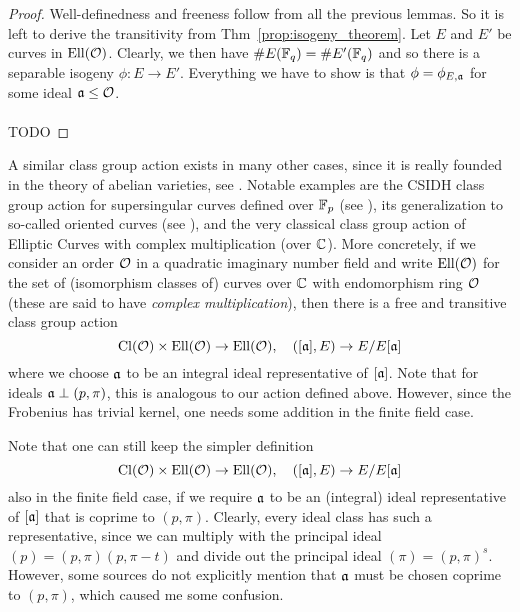 \begin{proof}
    Well-definedness and freeness follow from all the previous lemmas.
    So it is left to derive the transitivity from Thm~\ref{prop:isogeny_theorem}.
    Let $E$ and $E'$ be curves in $\mathrm{Ell}(\mathcal{O})$.
    Clearly, we then have $\#E(\mathbb{F}_q) = \#E'(\mathbb{F}_q)$ and so there is a separable isogeny $\phi: E \to E'$.
    Everything we have to show is that $\phi = \phi_{E, \mathfrak{a}}$ for some ideal $\mathfrak{a} \leq \mathcal{O}$.
    \\\\TODO
\end{proof}
A similar class group action exists in many other cases, since it is really founded in the theory of abelian varieties, see \cite{class_group_action_waterhouse}.
Notable examples are the CSIDH class group action for supersingular curves defined over $\mathbb{F}_p$ (see \cite{csidh}), its generalization to so-called oriented curves (see \cite{osidh}), and the very classical class group action of Elliptic Curves with complex multiplication (over $\mathbb{C}$).
More concretely, if we consider an order $\mathcal{O}$ in a quadratic imaginary number field and write $\mathrm{Ell}(\mathcal{O})$ for the set of (isomorphism classes of) curves over $\mathbb{C}$ with endomorphism ring $\mathcal{O}$ (these are said to have \emph{complex multiplication}), then there is a free and transitive class group action
\begin{equation*}
    \mathrm{Cl}(\mathcal{O}) \times \mathrm{Ell}(\mathcal{O}) \to \mathrm{Ell}(\mathcal{O}), \quad ([\mathfrak{a}], E) \to E/E[\mathfrak{a}]
\end{equation*}
where we choose $\mathfrak{a}$ to be an integral ideal representative of $[\mathfrak{a}]$.
Note that for ideals $\mathfrak{a} \perp (p, \pi)$, this is analogous to our action defined above.
However, since the Frobenius has trivial kernel, one needs some addition in the finite field case.

Note that one can still keep the simpler definition
\begin{equation*}
    \mathrm{Cl}(\mathcal{O}) \times \mathrm{Ell}(\mathcal{O}) \to \mathrm{Ell}(\mathcal{O}), \quad ([\mathfrak{a}], E) \to E/E[\mathfrak{a}]
\end{equation*}
also in the finite field case, if we require $\mathfrak{a}$ to be an (integral) ideal representative of $[\mathfrak{a}]$ that is coprime to $(p, \pi)$.
Clearly, every ideal class has such a representative, since we can multiply with the principal ideal $(p) = (p, \pi)(p, \pi - t)$ and divide out the principal ideal $(\pi) = (p, \pi)^s$.
However, some sources do not explicitly mention that $\mathfrak{a}$ must be chosen coprime to $(p, \pi)$, which caused me some confusion.

